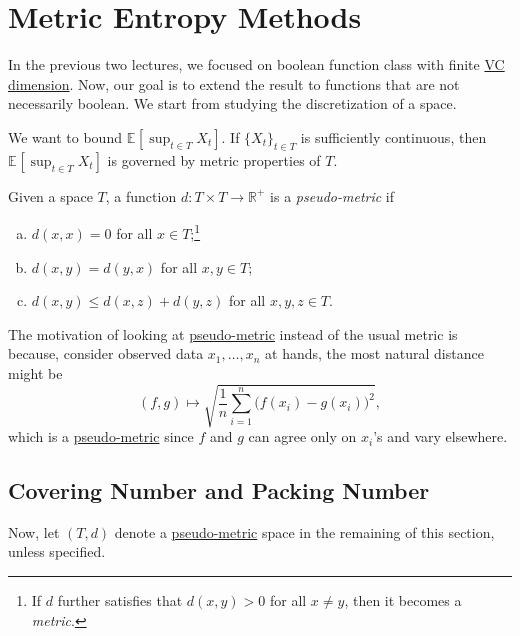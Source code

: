 \section{Metric Entropy Methods}
In the previous two lectures, we focused on boolean function class with finite \hyperref[def:VC-dimension]{VC dimension}. Now, our goal is to extend the result to functions that are not necessarily boolean. We start from studying the discretization of a space.

\begin{intuition}\label{int:informal-principle}
	We want to bound \(\mathbb{E}_{}\left[\sup _{t\in T } X_t \right]\). If \(\{ X_t \} _{t\in T}\) is sufficiently continuous, then \(\mathbb{E}_{}\left[\sup _{t\in T} X_t\right] \) is governed by metric properties of \(T\).
\end{intuition}

\begin{definition}\label{def:pseudo-metric}
	Given a space \(T\), a function \(d\colon T \times T \to \mathbb{R} ^+\) is a \emph{pseudo-metric} if
	\begin{enumerate}[(a)]
		\item \(d(x, x) = 0\) for all \(x \in T\);\footnote{If \(d\) further satisfies that \(d(x, y) > 0\) for all \(x \neq y\), then it becomes a \emph{metric}.}
		\item \(d(x, y) = d(y, x)\) for all \(x, y\in T\);
		\item \(d(x, y) \leq d(x, z) + d(y, z)\) for all \(x, y, z\in T\).
	\end{enumerate}
\end{definition}

\begin{note}
	The motivation of looking at \hyperref[def:pseudo-metric]{pseudo-metric} instead of the usual metric is because, consider observed data \(x_1, \dots , x_n\) at hands, the most natural distance might be
	\[
		(f, g) \mapsto \sqrt{\frac{1}{n} \sum_{i=1}^{n} \big(f(x_i) - g(x_i)\big)^2},
	\]
	which is a \hyperref[def:pseudo-metric]{pseudo-metric} since \(f\) and \(g\) can agree only on \(x_i\)'s and vary elsewhere.
\end{note}

\subsection{Covering Number and Packing Number}
Now, let \((T, d)\) denote a \hyperref[def:pseudo-metric]{pseudo-metric} space in the remaining of this section, unless specified.

